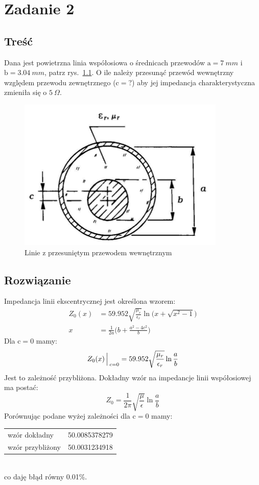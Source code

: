 \documentclass[rep.tex]{subfiles}
\begin{document}
\chapter{Zadanie 2}
\label{zad2}
\section{Treść}
Dana jest powietrzna linia współosiowa o średnicach przewodów $\mathrm{a} = 7~mm$ i $\mathrm{b} = 3.04~mm$, patrz rys.~\ref{fig:zad2:coax}.
O ile należy przesunąć przewód wewnętrzny względem przewodu zewnętrznego ($\mathrm{c} = ?$) aby jej impedancja charakterystyczna zmieniła się o $5~\Omega$.

\begin{figure}[!htbp]
  \centering
  \includegraphics[scale=0.5]{fig/zad2/coax}
  \caption{Linie z przesuniętym przewodem wewnętrznym}
  \label{fig:zad2:coax}
\end{figure}

\section{Rozwiązanie}
Impedancja linii ekscentrycznej jest określona wzorem:
\begin{align}
  Z_0(x) &= 59.952 \sqrt{\frac{\mu_r}{\epsilon_r}}\ln\big(x + \sqrt{x^2 - 1}\big) \\
  x      &= \frac{1}{2a}\bigg(b + \frac{a^2 - 4c^2}{b}\bigg) \label{eqn:zad2:x}
\end{align}
Dla $\mathrm{c} = 0$  mamy:
\begin{equation}
  Z_0(x)\Big\arrowvert_{c=0} = 59.952 \sqrt{\frac{\mu_r}{\epsilon_r}}\ln\frac{a}{b} \label{eqn:zad2:z}
\end{equation}
Jest to zależność przybliżona.
Dokładny wzór na impedancje linii współosiowej ma postać:
\begin{equation}
  Z_0 = \frac{1}{2\pi} \sqrt{\frac{\mu}{\epsilon}}\ln\frac{a}{b}
\end{equation}
Porównując podane wyżej zależności dla $\mathrm{c} = 0$ mamy:\\
\begin{tabular}{l @{ : } l}
wzór dokładny    & 50.0085378279 \\
wzór przybliżony & 50.0031234918 \\
\end{tabular}\\
co daję błąd równy 0.01\%.
\end{document}
